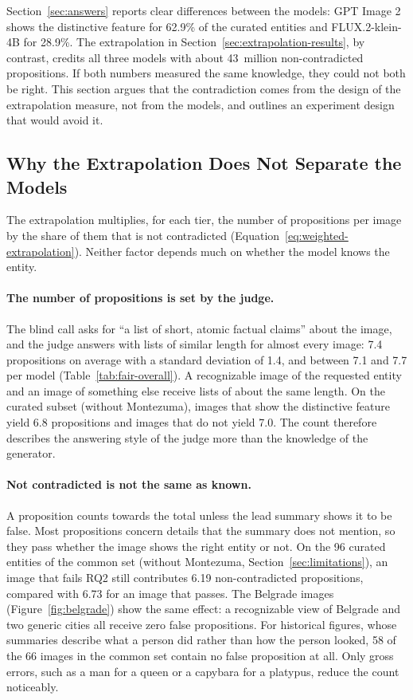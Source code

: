 Section~\ref{sec:answers} reports clear differences between the models: GPT
Image 2 shows the distinctive feature for 62.9\% of the curated entities and
FLUX.2-klein-4B for 28.9\%. The extrapolation in
Section~\ref{sec:extrapolation-results}, by contrast, credits all three models
with about 43~million non-contradicted propositions. If both numbers measured
the same knowledge, they could not both be right. This section argues that the
contradiction comes from the design of the extrapolation measure, not from the
models, and outlines an experiment design that would avoid it.

\subsection{Why the Extrapolation Does Not Separate the Models}
\label{sec:extrapolation-critique}

The extrapolation multiplies, for each tier, the number of propositions per
image by the share of them that is not contradicted
(Equation~\ref{eq:weighted-extrapolation}). Neither factor depends much on
whether the model knows the entity.

\paragraph{The number of propositions is set by the judge.} The blind call asks
for ``a list of short, atomic factual claims'' about the image, and the judge
answers with lists of similar length for almost every image: 7.4 propositions
on average with a standard deviation of 1.4, and between 7.1 and 7.7 per model
(Table~\ref{tab:fair-overall}). A recognizable image of the requested entity and
an image of something else receive lists of about the same length. On the
curated subset (without Montezuma), images that show the distinctive feature yield 6.8 propositions
and images that do not yield 7.0. The count therefore describes the answering
style of the judge more than the knowledge of the generator.

\paragraph{Not contradicted is not the same as known.} A proposition counts
towards the total unless the lead summary shows it to be false. Most
propositions concern details that the summary does not mention, so they pass
whether the image shows the right entity or not. On the 96 curated entities of
the common set (without Montezuma, Section~\ref{sec:limitations}), an image
that fails RQ2 still contributes 6.19 non-contradicted propositions, compared
with 6.73 for an image that passes. The Belgrade images
(Figure~\ref{fig:belgrade}) show the same effect: a recognizable view of
Belgrade and two generic cities all receive zero false propositions. For
historical figures, whose summaries describe what a person did rather than how
the person looked, 58 of the 66 images in the common set contain no false
proposition at all. Only gross errors, such as a man for a queen or a capybara
for a platypus, reduce the count noticeably.

